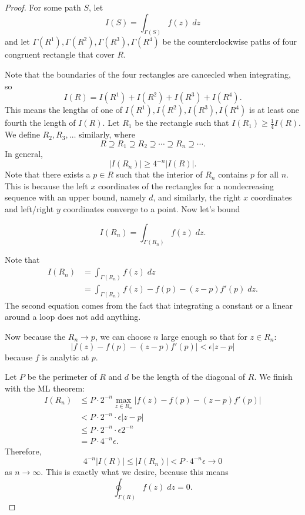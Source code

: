 \documentclass[notes]{subfile}
\begin{document}
\begin{proof}
    For some path $S$, let 
    \[ I(S) = \int_{\Gamma(S)} f(z) \; dz \]
    and let $\Gamma(R^1), \Gamma(R^2), \Gamma(R^3), \Gamma(R^4)$
    be the counterclockwise paths of four congruent rectangle that cover $R$.
    
    \noindent
    Note that the boundaries of the four rectangles are cancecled when integrating, so
    \[ I(R) = I(R^1) + I(R^2) + I(R^3) + I(R^4). \]
    This means the lengths of one of
    $I(R^1), I(R^2), I(R^3), I(R^4)$ is at least
    one fourth the length of $I(R)$.
    Let $R_1$ be the rectangle such that $I(R_1) \ge \frac{1}{4} I(R)$.
    We define $R_2, R_3, \ldots$ similarly, where
    \[ R \supseteq R_1 \supseteq R_2 \supseteq \cdots
    \supseteq R_n \supseteq \cdots .\]
    In general,
    \[ |I(R_n) | \ge 4^{-n} |I(R)|. \]
    Note that there exists a $p \in R$ such that the interior
    of $R_n$ contains $p$ for all $n$.
    This is because the left $x$ coordinates of the rectangles
    for a nondecreasing sequence with an upper bound, namely $d$,
    and similarly, the right $x$ coordinates and left/right
    $y$ coordinates converge to a point.
    Now let's bound

    \[ I(R_n) = \int_{\Gamma(R_n)} f(z) \; dz. \]

    Note that
    \begin{align*}
        I(R_n) &= \int_{\Gamma(R_n)} f(z) \; dz \\
        &= \int_{\Gamma(R_n)} f(z) - f(p) - (z-p)f'(p) \; dz.
    \end{align*}
    The second equation comes from the fact that integrating
    a constant or a linear around a loop does not add anything.

    Now because the $R_n \to p$, we can choose $n$ large 
    enough so that for $z \in R_n$:
    \[ |f(z) - f(p) - (z-p)f'(p)| < \epsilon |z-p| \]
    because $f$ is analytic at $p$.
    
    Let $P$ be the perimeter of $R$ and $d$ be
    the length of the diagonal of $R$.
    We finish with the ML theorem:
    \begin{align*}
        I(R_n) &\le P \cdot 2^{-n} \max_{z \in R_n} |f(z) - f(p) - (z-p)f'(p)| \\
        &< P \cdot 2^{-n} \cdot \epsilon|z-p| \\
        &\le P \cdot 2^{-n} \cdot \epsilon 2^{-n} \\
        &= P \cdot 4^{-n} \epsilon.
    \end{align*}
    Therefore,
    \[ 4^{-n} |I(R)| \le |I(R_n)| < P \cdot 4^{-n}\epsilon \to 0 \]
    as $n \to \infty$.
    This is exactly what we desire, because this means
    \[ \oint_{\Gamma(R)} f(z) \; dz = 0. \]
    
\end{proof}
\end{document}
